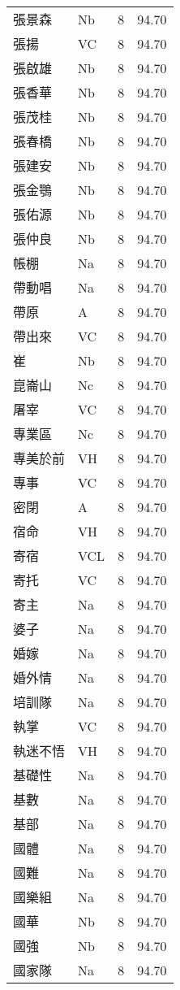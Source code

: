 \documentclass[twocolumn]{book}
\begin{document}
\begin{supertabular}{llrr}
張景森 & Nb & 8 &  94.70\\
張揚 & VC & 8 &  94.70\\
張啟雄 & Nb & 8 &  94.70\\
張香華 & Nb & 8 &  94.70\\
張茂桂 & Nb & 8 &  94.70\\
張春橋 & Nb & 8 &  94.70\\
張建安 & Nb & 8 &  94.70\\
張金鶚 & Nb & 8 &  94.70\\
張佑源 & Nb & 8 &  94.70\\
張仲良 & Nb & 8 &  94.70\\
帳棚 & Na & 8 &  94.70\\
帶動唱 & Na & 8 &  94.70\\
帶原 & A & 8 &  94.70\\
帶出來 & VC & 8 &  94.70\\
崔 & Nb & 8 &  94.70\\
崑崙山 & Nc & 8 &  94.70\\
屠宰 & VC & 8 &  94.70\\
專業區 & Nc & 8 &  94.70\\
專美於前 & VH & 8 &  94.70\\
專事 & VC & 8 &  94.70\\
密閉 & A & 8 &  94.70\\
宿命 & VH & 8 &  94.70\\
寄宿 & VCL & 8 &  94.70\\
寄托 & VC & 8 &  94.70\\
寄主 & Na & 8 &  94.70\\
婆子 & Na & 8 &  94.70\\
婚嫁 & Na & 8 &  94.70\\
婚外情 & Na & 8 &  94.70\\
培訓隊 & Na & 8 &  94.70\\
執掌 & VC & 8 &  94.70\\
執迷不悟 & VH & 8 &  94.70\\
基礎性 & Na & 8 &  94.70\\
基數 & Na & 8 &  94.70\\
基部 & Na & 8 &  94.70\\
國體 & Na & 8 &  94.70\\
國難 & Na & 8 &  94.70\\
國樂組 & Na & 8 &  94.70\\
國華 & Nb & 8 &  94.70\\
國強 & Nb & 8 &  94.70\\
國家隊 & Na & 8 &  94.70\\

\end{supertabular}
\end{document}
